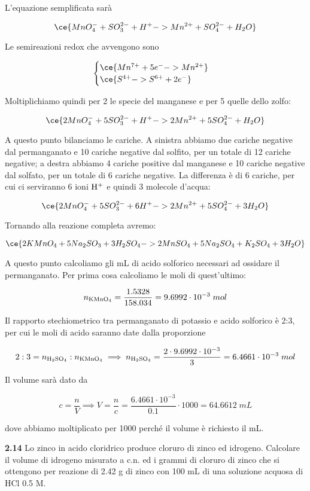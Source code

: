 L'equazione semplificata sarà

$$\ce{MnO_4^- + SO_3^{2-} + H^+ -> Mn^{2+} + SO_4^{2-} + H_2O}$$

Le semireazioni redox che avvengono sono

$$\begin{cases}
\ce{Mn^{7+} + 5e^- -> Mn^{2+}}\\
\ce{S^{4+} -> S^{6+} + 2e^-}
\end{cases}$$

Moltiplichiamo quindi per 2 le specie del manganese e per 5 quelle dello zolfo:

$$\ce{2MnO_4^- + 5SO_3^{2-} + H^+ -> 2Mn^{2+} + 5SO_4^{2-} + H_2O}$$

A questo punto bilanciamo le cariche. A sinistra abbiamo due cariche negative dal permanganato e 10 cariche negative dal solfito, per un totale di 12 cariche negative; a destra abbiamo 4 cariche positive dal manganese e 10 cariche negative dal solfato, per un totale di 6 cariche negative. La differenza è di 6 cariche, per cui ci serviranno 6 ioni $\rm H^+$ e quindi 3 molecole d'acqua:

$$\ce{2MnO_4^- + 5SO_3^{2-} + 6H^+ -> 2Mn^{2+} + 5SO_4^{2-} + 3H_2O}$$

Tornando alla reazione completa avremo:

$$\ce{2KMnO_4 + 5Na_2SO_3 + 3H_2SO_4 -> 2MnSO_4 + 5Na_2SO_4 + K_2SO_4 + 3H_2O}$$

A questo punto calcoliamo gli mL di acido solforico necessari ad ossidare il permanganato. Per prima cosa calcoliamo le moli di quest'ultimo:

$$n_{\rm KMnO_4}=\frac{1.5328}{158.034}
=9.6992 \cdot 10^{-3}\;mol$$

Il rapporto stechiometrico tra permanganato di potassio e acido solforico è 2:3, per cui le moli di acido saranno date dalla proporzione

$$2:3=n_{\rm H_2SO_4}:n_{\rm KMnO_4}
\implies
n_{\rm H_2SO_4}=\frac{2 \cdot 9.6992 \cdot 10^{-3}}{3}
=6.4661 \cdot 10^{-3}\;mol$$

Il volume sarà dato da

$$c=\frac{n}{V}
\implies
V=\frac{n}{c}=\frac{6.4661 \cdot 10^{-3}}{0.1} \cdot 1000
=64.6612\;mL$$

dove abbiamo moltiplicato per 1000 perché il volume è richiesto il mL.

\newpage

\vspace{0.2cm}\textbf{2.14} Lo zinco in acido cloridrico produce cloruro di zinco ed idrogeno. Calcolare il volume di
idrogeno misurato a c.n. ed i grammi di cloruro di zinco che si ottengono per reazione di 2.42 g di zinco con 100 mL di una soluzione acquosa di HCl 0.5 M.

